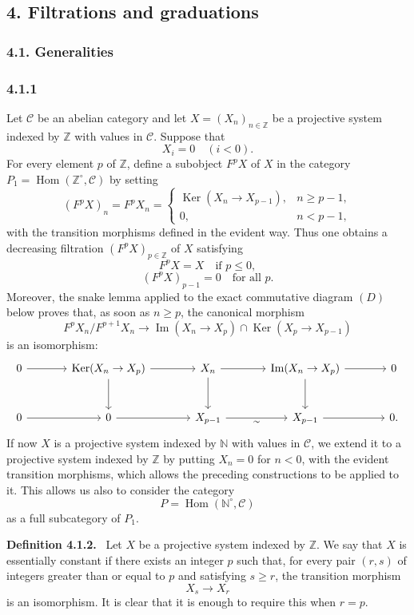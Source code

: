 \documentclass[11pt]{article}
\providecommand{\ZZ}{\mathbb{Z}}
\providecommand{\NN}{\mathbb{N}}
\newenvironment{statement}[1]{\par\medskip\noindent\textbf{#1.}\ }{\par\medskip}
\DeclareMathOperator{\Hom}{Hom}
\providecommand{\Ker}{\operatorname{Ker}}
\providecommand{\Hom}{\operatorname{Hom}}
\providecommand{\NN}{\mathbb N}
\providecommand{\cC}{\mathcal C}
\providecommand{\Im}{\operatorname{Im}}
\providecommand{\Ker}{\operatorname{Ker}}
\renewcommand{\Im}{\operatorname{Im}}
\providecommand{\Ker}{\operatorname{Ker}}
\providecommand{\Im}{\operatorname{Im}}
\begin{document}
\subsection*{4. Filtrations and graduations}
\subsubsection*{4.1. Generalities}
\subsubsection*{4.1.1}
Let $\cC$ be an abelian category and let $X=(X_n)_{n\in\ZZ}$ be a projective system indexed by $\ZZ$ with values in $\cC$. Suppose that
\[
X_i=0\quad(i<0).
\]
For every element $p$ of $\ZZ$, define a subobject $F^pX$ of $X$ in the category $P_1=\Hom(\ZZ^\circ,\cC)$ by setting
\[
(F^pX)_n=F^pX_n=
\begin{cases}
\Ker(X_n\to X_{p-1}),& n\ge p-1,\\
0,& n<p-1,
\end{cases}
\]
with the transition morphisms defined in the evident way. Thus one obtains a decreasing filtration $(F^pX)_{p\in\ZZ}$ of $X$ satisfying
\[
F^pX=X\quad\text{if }p\le0,
\]
\[
(F^pX)_{p-1}=0\quad\text{for all }p.
\]
Moreover, the snake lemma applied to the exact commutative diagram $(D)$ below proves that, as soon as $n\ge p$, the canonical morphism
\[
F^pX_n/F^{p+1}X_n\longrightarrow \Im(X_n\to X_p)\cap\Ker(X_p\to X_{p-1})
\]
is an isomorphism:
\[
\begin{tikzcd}[column sep=large,row sep=large]
0 \arrow[r] & \Ker(X_n\to X_p) \arrow[r] \arrow[d] & X_n \arrow[r] \arrow[d] & \Im(X_n\to X_p) \arrow[r] \arrow[d] & 0\\
0 \arrow[r] & 0 \arrow[r] & X_{p-1} \arrow[r,"\sim"'] & X_{p-1} \arrow[r] & 0 .
\end{tikzcd}
\]
If now $X$ is a projective system indexed by $\NN$ with values in $\cC$, we extend it to a projective system indexed by $\ZZ$ by putting $X_n=0$ for $n<0$, with the evident transition morphisms, which allows the preceding constructions to be applied to it. This allows us also to consider the category
\[
P=\Hom(\NN^\circ,\cC)
\]
as a full subcategory of $P_1$.

\begin{statement}{Definition 4.1.2}
Let $X$ be a projective system indexed by $\ZZ$. We say that $X$ is essentially constant if there exists an integer $p$ such that, for every pair $(r,s)$ of integers greater than or equal to $p$ and satisfying $s\ge r$, the transition morphism
\[
X_s\longrightarrow X_r
\]
is an isomorphism. It is clear that it is enough to require this when $r=p$.
\end{statement}
\end{document}

